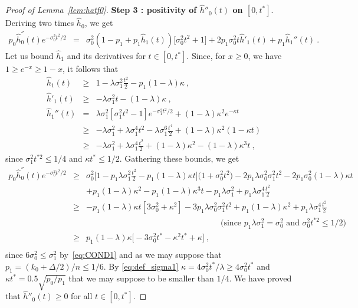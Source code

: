 \documentclass[twoside,11pt]{article}
\def\beqn{\begin{eqnarray*}}
\def\eeqn{\end{eqnarray*}}
\newcommand{\<}{\langle}
\renewcommand{\>}{\rangle}
\begin{document}
\begin{proof}[Proof of Lemma~\ref{lem:hatf0}]
\bigskip 


\noindent 
{\bf Step 3 : positivity of $\widehat{h}''_0(t)$ on $[0,t^*]$}. Deriving two times $\widehat{h}_0$, we get 
\beqn 
p_0 \widehat{h}^{''}_0(t)e^{-\sigma_0^2t^2 /2}&= &  \sigma_0^2 (1-p_1 + p_1 \widehat{h}_1(t))\big[\sigma_0^2 t^2 +1 \big] + 2p_1 \sigma_0^2t \widehat{h}'_1(t)  + p_1 \widehat{h}_1''(t)\ .
\eeqn
Let us bound $\widehat{h}_1$ and its derivatives for $t\in [0,t^*]$. Since, for $x\geq 0$, we have $1\geq e^{-x}\geq 1 -x$, it follows that 
\beqn 
\widehat{h}_1(t)&\geq & 1 -  \lambda \sigma_1^2\frac{t^2}{2} - p_1(1-\lambda) \kappa \ , \\
\widehat{h}'_1(t)&\geq &  -  \lambda \sigma_1^2t  - (1-\lambda) \kappa \ ,  \\
\widehat{h}_1''(t) &=&    \lambda \sigma_1^2 [\sigma_1^2t^2 -1]e^{-\sigma_1^2t^2/2} +   (1-\lambda) \kappa^2 e^{-\kappa t }
\\
& \geq& - \lambda\sigma^2_1 + \lambda  \sigma_1^4t^2- \lambda \sigma_1^6\frac{t^4}{2} + (1-\lambda)\kappa^2 (1-\kappa t) \\  
&\geq & - \lambda\sigma^2_1 + \lambda  \sigma_1^4\frac{t^2}{2} + (1-\lambda)\kappa ^2 - (1-\lambda)\kappa ^3t\ ,
\eeqn 
since $\sigma_1^2 t^{*2}\leq 1/4$ and $\kappa t^*\leq 1/2$. Gathering these bounds, we get 
\beqn 
p_0 \widehat{h}^{''}_0(t)e^{-\sigma_0^2t^2 /2} &\geq  & \sigma_0^2 \Big[1 - p_1 \lambda \sigma_1^2 \frac{t^2}{2} - p_1 (1-\lambda)\kappa t  \Big]\big(1+ \sigma_0^2 t^2\big) - 2p_1 \lambda \sigma^2_0\sigma_1^2t^2  -  2p_1  \sigma_0^2  (1-\lambda)\kappa t  \\ 
&& +  p_1 (1-\lambda) \kappa^2- p_1 (1-\lambda)\kappa ^3t -p_1  \lambda  \sigma_1^2+ p_1  \lambda \sigma_1^4\frac{t^2}{2}\\
&\geq & - p_1 (1-\lambda)\kappa  t [3\sigma_0^2+ \kappa^2]  - 3p_1 \lambda \sigma_0^2  \sigma_1^2 t^2 +  p_1(1-\lambda) \kappa^2 + p_1  \lambda \sigma_1^4 \frac{t^2}{2} \\
&& \hspace{6cm} \quad \quad \text{(since $p_1\lambda \sigma_1^2=\sigma_0^2$ and $\sigma_0^2t^{*2}\leq 1/2$)}\\
&\geq &p_1 (1-\lambda)\kappa \Big[- 3\sigma_0^2t^*  -\kappa^2 t^* +   \kappa\Big]\ , \\
\eeqn 
since $6\sigma_0^2\leq \sigma_1^2$ by~\eqref{eq:COND1} and  as we may suppose that $p_1= (k_0+\Delta/2)/n\leq 1/6$. By \eqref{eq:def_sigma1} $\kappa=4\sigma_0^2t^*/\lambda \geq 4\sigma_0^2t^*$ and $\kappa t^*= 0.5\sqrt{p_0/p_1}$ that we may suppose to be smaller than $1/4$. We have proved that $\widehat{h}''_0(t)\geq 0$ for all $t\in [0,t^*]$. 




\end{proof}
\end{document}
